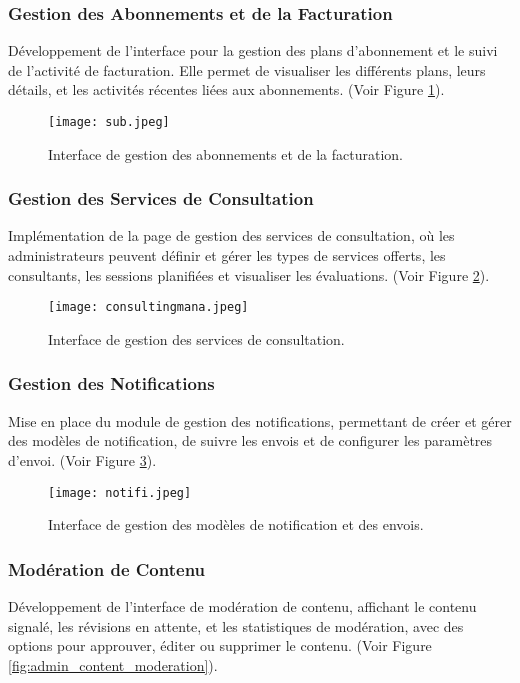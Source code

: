 \documentclass[12pt, a4paper]{article}
\begin{document}
\subsubsection{Gestion des Abonnements et de la Facturation}
Développement de l'interface pour la gestion des plans d'abonnement et le suivi de l'activité de facturation. Elle permet de visualiser les différents plans, leurs détails, et les activités récentes liées aux abonnements. (Voir Figure \ref{fig:admin_subscription_billing}).

\begin{figure}[htbp]
  \centering
  \texttt{[image: sub.jpeg]} 
  \caption{Interface de gestion des abonnements et de la facturation.}
  \label{fig:admin_subscription_billing}
\end{figure}

\subsubsection{Gestion des Services de Consultation}
Implémentation de la page de gestion des services de consultation, où les administrateurs peuvent définir et gérer les types de services offerts, les consultants, les sessions planifiées et visualiser les évaluations. (Voir Figure \ref{fig:admin_consultation_management}).

\begin{figure}[htbp]
  \centering
  \texttt{[image: consultingmana.jpeg]} 
  \caption{Interface de gestion des services de consultation.}
  \label{fig:admin_consultation_management}
\end{figure}

\subsubsection{Gestion des Notifications}
Mise en place du module de gestion des notifications, permettant de créer et gérer des modèles de notification, de suivre les envois et de configurer les paramètres d'envoi. (Voir Figure \ref{fig:admin_notifications}).

\begin{figure}[htbp]
  \centering
  \texttt{[image: notifi.jpeg]} 
  \caption{Interface de gestion des modèles de notification et des envois.}
  \label{fig:admin_notifications}
\end{figure}

\subsubsection{Modération de Contenu}
Développement de l'interface de modération de contenu, affichant le contenu signalé, les révisions en attente, et les statistiques de modération, avec des options pour approuver, éditer ou supprimer le contenu. (Voir Figure \ref{fig:admin_content_moderation}).
\end{document}
